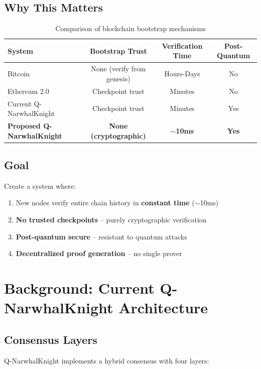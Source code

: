 \documentclass[11pt,a4paper]{article}
\begin{document}
\subsection{Why This Matters}

\begin{table}[h]
\centering
\begin{tabular}{lccc}
\toprule
\textbf{System} & \textbf{Bootstrap Trust} & \textbf{Verification Time} & \textbf{Post-Quantum} \\
\midrule
Bitcoin & None (verify from genesis) & Hours-Days & No \\
Ethereum 2.0 & Checkpoint trust & Minutes & No \\
Current Q-NarwhalKnight & Checkpoint trust & Minutes & Yes \\
\textbf{Proposed Q-NarwhalKnight} & \textbf{None (cryptographic)} & \textbf{$\sim$10ms} & \textbf{Yes} \\
\bottomrule
\end{tabular}
\caption{Comparison of blockchain bootstrap mechanisms}
\end{table}

\subsection{Goal}

Create a system where:
\begin{enumerate}
    \item New nodes verify entire chain history in \textbf{constant time} ($\sim$10ms)
    \item \textbf{No trusted checkpoints} -- purely cryptographic verification
    \item \textbf{Post-quantum secure} -- resistant to quantum attacks
    \item \textbf{Decentralized proof generation} -- no single prover
\end{enumerate}

\section{Background: Current Q-NarwhalKnight Architecture}

\subsection{Consensus Layers}

Q-NarwhalKnight implements a hybrid consensus with four layers:
\end{document}
